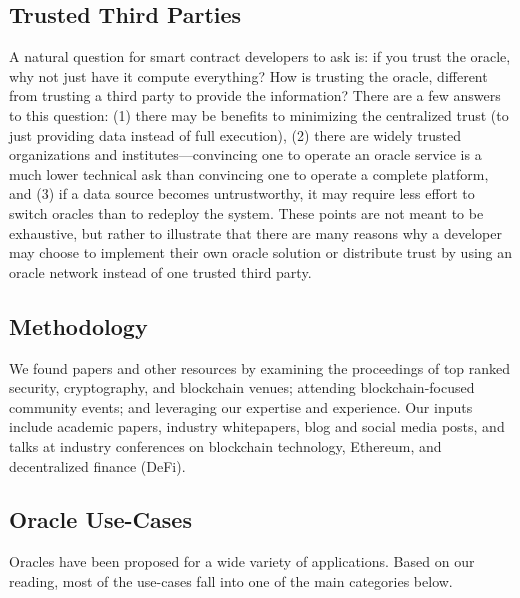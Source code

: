 \subsection{Trusted Third Parties} A natural question for smart contract developers to ask is: if you trust the oracle, why not just have it compute everything? How is trusting the oracle, different from trusting a third party to provide the information? There are a few answers to this question: (1) there may be benefits to minimizing the centralized trust (\ie to just providing data instead of full execution), (2) there are widely trusted organizations and institutes---convincing one to operate an oracle service is a much lower technical ask than convincing one to operate a complete platform, and (3) if a data source becomes untrustworthy, it may require less effort to switch oracles than to redeploy the system. These points are not meant to be exhaustive, but rather to illustrate that there are many reasons why a developer may choose to implement their own oracle solution or distribute trust by using an oracle network instead of one trusted third party. 

\subsection{Methodology} We found papers and other resources by examining the proceedings of top ranked security, cryptography, and blockchain venues; attending blockchain-focused community events; and leveraging our expertise and experience. Our inputs include academic papers, industry whitepapers, blog and social media posts, and talks at industry conferences on blockchain technology, Ethereum, and decentralized finance (DeFi). %


\subsection{Oracle Use-Cases} Oracles have been proposed for a wide variety of applications. Based on our reading, most of the use-cases fall into one of the main categories below.

